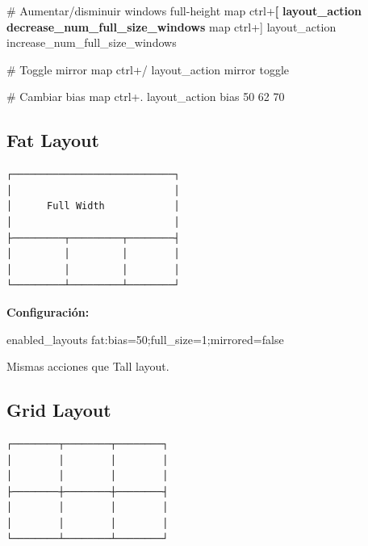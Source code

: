 \documentclass[
  doc,
  floatsintext,
  longtable,
  a4paper,
  nolmodern,
  notxfonts,
  notimes,
  12pt,
  colorlinks=true,linkcolor=blue,citecolor=blue,urlcolor=blue]{apa7}
\newenvironment{Shaded}{\begin{snugshade}}{\end{snugshade}}
\newcommand{\CommentTok}[1]{\textcolor[rgb]{0.37,0.37,0.37}{#1}}
\newcommand{\ConstantTok}[1]{\textcolor[rgb]{0.56,0.35,0.01}{#1}}
\newcommand{\DataTypeTok}[1]{\textcolor[rgb]{0.68,0.00,0.00}{#1}}
\newcommand{\DecValTok}[1]{\textcolor[rgb]{0.68,0.00,0.00}{#1}}
\newcommand{\ErrorTok}[1]{\textcolor[rgb]{0.68,0.00,0.00}{#1}}
\newcommand{\KeywordTok}[1]{\textcolor[rgb]{0.00,0.23,0.31}{\textbf{#1}}}
\newcommand{\OperatorTok}[1]{\textcolor[rgb]{0.37,0.37,0.37}{#1}}
\begin{document}
\begin{Shaded}
\begin{Highlighting}[]
\CommentTok{\# Aumentar/disminuir windows full{-}height}
\DataTypeTok{map} \DataTypeTok{ctrl}\ErrorTok{+}\KeywordTok{[} \KeywordTok{layout\_action} \KeywordTok{decrease\_num\_full\_size\_windows}
\DataTypeTok{map} \DataTypeTok{ctrl}\ErrorTok{+]} \DataTypeTok{layout\_action} \DataTypeTok{increase\_num\_full\_size\_windows}

\CommentTok{\# Toggle mirror}
\DataTypeTok{map} \DataTypeTok{ctrl}\ErrorTok{+/} \DataTypeTok{layout\_action} \DataTypeTok{mirror} \DataTypeTok{toggle}

\CommentTok{\# Cambiar bias}
\DataTypeTok{map} \DataTypeTok{ctrl}\ErrorTok{+}\DataTypeTok{.} \DataTypeTok{layout\_action} \DataTypeTok{bias} \DataTypeTok{50} \DataTypeTok{62} \DataTypeTok{70}
\end{Highlighting}
\end{Shaded}

\subsection{Fat Layout}\label{fat-layout}

\begin{verbatim}
┌────────────────────────────┐
│                            │
│      Full Width            │
│                            │
├─────────┬─────────┬────────┤
│         │         │        │
│         │         │        │
└─────────┴─────────┴────────┘
\end{verbatim}

\textbf{Configuración:}

\begin{Shaded}
\begin{Highlighting}[]
\DataTypeTok{enabled\_layouts} \DataTypeTok{fat}\ErrorTok{:}\DataTypeTok{bias}\OperatorTok{=}\DecValTok{50}\ErrorTok{;}\DataTypeTok{full\_size}\OperatorTok{=}\DecValTok{1}\ErrorTok{;}\DataTypeTok{mirrored}\OperatorTok{=}\ConstantTok{false}
\end{Highlighting}
\end{Shaded}

Mismas acciones que Tall layout.

\subsection{Grid Layout}\label{grid-layout}

\begin{verbatim}
┌────────┬────────┬────────┐
│        │        │        │
│        │        │        │
├────────┼────────┼────────┤
│        │        │        │
│        │        │        │
└────────┴────────┴────────┘
\end{verbatim}
\end{document}
